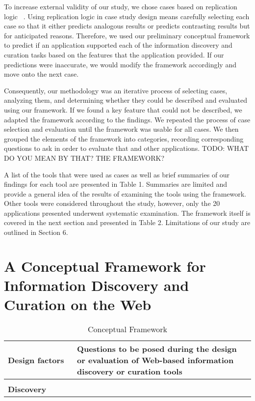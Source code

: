 \documentclass{casconpaper}
\begin{document}
{{To increase external validity of our study, we chose cases based on replication logic ~\cite{yin}. Using replication logic in case study design means carefully selecting each case so that it either predicts analogous results or predicts contrasting results but for anticipated reasons. Therefore, we used our preliminary conceptual framework to predict if an application supported each of the information discovery and curation tasks based on the features that the application provided. If our predictions were inaccurate, we would modify the framework accordingly and move onto the next case. 

Consequently, our methodology was an iterative process of selecting cases, analyzing them, and determining whether they could be described and evaluated using our framework. If we found a key feature that could not be described, we adapted the framework according to the findings. We repeated the process of case selection and evaluation until the framework was usable for all cases. We then grouped the elements of the framework into categories, recording corresponding questions to ask in order to evaluate that and other applications. TODO: WHAT DO YOU MEAN BY THAT? THE FRAMEWORK?

A list of the tools that were used as cases as well as brief summaries of our findings for each tool are presented in Table 1. Summaries are limited and provide a general idea of the results of examining the tools using the framework. Other tools were considered throughout the study, however, only the 20 applications presented underwent systematic examination. The framework itself is covered in the next section and presented in Table 2. Limitations of our study are outlined in Section 6.

} %

{\section{A Conceptual Framework for Information Discovery and Curation on the Web}
\begin{table*}[htbp]
\caption{Conceptual Framework}
\centering
\small
\begin{tabular}{|p{0.28\linewidth}|p{0.72\linewidth}|}
\hline
\textbf{\large{Design factors}}   & \textbf{\large{Questions to be posed during the design or evaluation of Web-based information discovery or curation tools 
}}  \\
\hline
&\\
\textbf{\large{Discovery}}                     &                                                                                                           \\


\end{tabular}
\end{table*}}}
\end{document}
